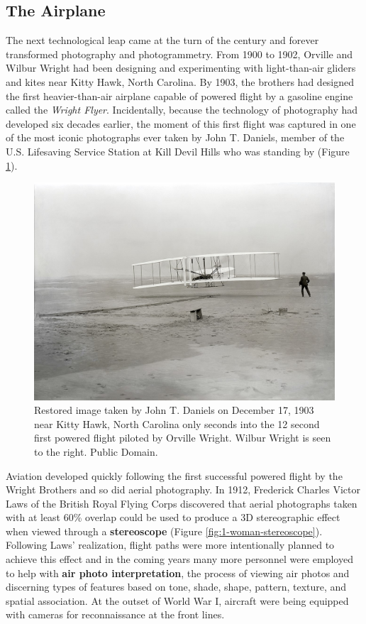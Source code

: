 \documentclass[
]{book}
\begin{document}
\subsection{The Airplane}\label{the-airplane}

The next technological leap came at the turn of the century and forever transformed photography and photogrammetry. From 1900 to 1902, Orville and Wilbur Wright had been designing and experimenting with light-than-air gliders and kites near Kitty Hawk, North Carolina. By 1903, the brothers had designed the first heavier-than-air airplane capable of powered flight by a gasoline engine called the \emph{Wright Flyer}. Incidentally, because the technology of photography had developed six decades earlier, the moment of this first flight was captured in one of the most iconic photographs ever taken by John T. Daniels, member of the U.S. Lifesaving Service Station at Kill Devil Hills who was standing by (Figure \ref{fig:1-wright-flyer}).

\begin{figure}
\includegraphics[width=0.75\linewidth]{images/01-wright-flyer} \caption{Restored image taken by John T. Daniels on December 17, 1903 near Kitty Hawk, North Carolina only seconds into the 12 second first powered flight piloted by Orville Wright. Wilbur Wright is seen to the right. Public Domain.}\label{fig:1-wright-flyer}
\end{figure}

Aviation developed quickly following the first successful powered flight by the Wright Brothers and so did aerial photography. In 1912, Frederick Charles Victor Laws of the British Royal Flying Corps discovered that aerial photographs taken with at least 60\% overlap could be used to produce a 3D stereographic effect when viewed through a \textbf{stereoscope} (Figure \ref{fig:1-woman-stereoscope}). Following Laws' realization, flight paths were more intentionally planned to achieve this effect and in the coming years many more personnel were employed to help with \textbf{air photo interpretation}, the process of viewing air photos and discerning types of features based on tone, shade, shape, pattern, texture, and spatial association. At the outset of World War I, aircraft were being equipped with cameras for reconnaissance at the front lines.
\end{document}
